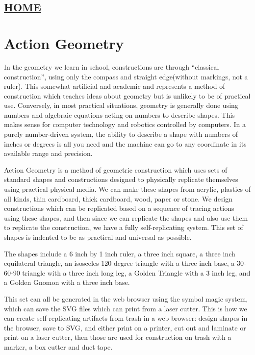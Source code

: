 \hypertarget{home}{%
\subsection{\texorpdfstring{\href{scrolls/home}{HOME}}{HOME}}\label{home}}

\hypertarget{action-geometry}{%
\section{Action Geometry}\label{action-geometry}}

In the geometry we learn in school, constructions are through
``classical construction'', using only the compass and straight
edge(without markings, not a ruler). This somewhat artificial and
academic and represents a method of construction which teaches ideas
about geometry but is unlikely to be of practical use. Conversely, in
most practical situations, geometry is generally done using numbers and
algebraic equations acting on numbers to describe shapes. This makes
sense for computer technology and robotics controlled by computers. In a
purely number-driven system, the ability to describe a shape with
numbers of inches or degrees is all you need and the machine can go to
any coordinate in its available range and precision.

Action Geometry is a method of geometric construction which uses sets of
standard shapes and constructions designed to physically replicate
themselves using practical physical media. We can make these shapes from
acrylic, plastics of all kinds, thin cardboard, thick cardboard, wood,
paper or stone. We design constructions which can be replicated based on
a sequence of tracing actions using these shapes, and then since we can
replicate the shapes and also use them to replicate the construction, we
have a fully self-replicating system. This set of shapes is indented to
be as practical and universal as possible.

The shapes include a 6 inch by 1 inch ruler, a three inch square, a
three inch equilateral triangle, an isosceles 120 degree triangle with a
three inch base, a 30-60-90 triangle with a three inch long leg, a
Golden Triangle with a 3 inch leg, and a Golden Gnomon with a three inch
base.

This set can all be generated in the web browser using the symbol magic
system, which can save the SVG files which can print from a laser
cutter. This is how we can create self-replicating artifacts from trash
in a web browser: design shapes in the browser, save to SVG, and either
print on a printer, cut out and laminate or print on a laser cutter,
then those are used for construction on trash with a marker, a box
cutter and duct tape.

